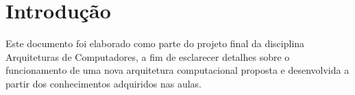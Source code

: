 \documentclass[
	12pt,				%
	oneside,			%
	a4paper,			%
	english,			%
	french,				%
	spanish,			%
	brazil				%
	]{abntex2}
\begin{document}
\frenchspacing 


\imprimircapa





\tableofcontents*
\cleardoublepage



\textual

\chapter*[Introdução]{Introdução}

Este documento foi elaborado como parte do projeto final da disciplina Arquiteturas de Computadores, a fim de esclarecer detalhes sobre o funcionamento de uma nova arquitetura computacional proposta e desenvolvida a partir dos conhecimentos adquiridos nas aulas.
\end{document}
